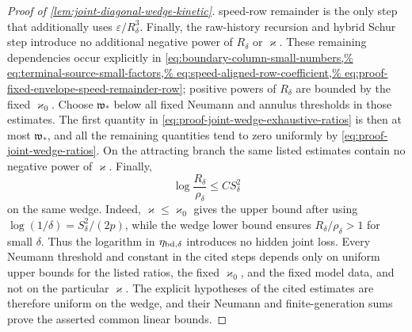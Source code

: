 \begin{proof}[Proof of
\cref{lem:joint-diagonal-wedge-kinetic}]
speed-row remainder is the only step that additionally uses
\(\varepsilon/R_\delta^3\).  Finally, the raw-history recursion and hybrid
Schur step introduce no additional negative power of \(R_\delta\) or
\(\varkappa\).  These remaining dependencies occur explicitly in
\cref{eq:boundary-column-small-numbers,%
eq:terminal-source-small-factors,%
eq:speed-aligned-row-coefficient,%
eq:proof-fixed-envelope-speed-remainder-row}; positive powers of \(R_\delta\) are
bounded by the fixed \(\varkappa_0\).  Choose \(\mathfrak w_*\) below all
fixed Neumann and annulus thresholds in those estimates.  The first
quantity in \cref{eq:proof-joint-wedge-exhaustive-ratios} is then at most
\(\mathfrak w_*\), and all the remaining quantities tend to zero uniformly
by \cref{eq:proof-joint-wedge-ratios}.  On the attracting branch the same
listed estimates contain no negative power of \(\varkappa\).  Finally,
\[
 \log\frac{R_\delta}{\rho_\delta}\le C S_\delta^2
\]
on the same wedge.  Indeed, \(\varkappa\le\varkappa_0\) gives the upper
bound after using \(\log(1/\delta)=S_\delta^2/(2p)\), while the wedge lower
bound ensures \(R_\delta/\rho_\delta>1\) for small \(\delta\).
Thus the logarithm in \(\eta_{{\rm bd},\delta}\) introduces no hidden
joint loss.  Every Neumann threshold and constant in the cited steps depends
only on uniform upper bounds for the listed ratios, the fixed
\(\varkappa_0\), and the fixed model data, and not on the particular
\(\varkappa\).  The explicit hypotheses of the cited estimates are therefore
uniform on the wedge, and their Neumann and finite-generation sums prove the
asserted common linear bounds.


\end{proof}

